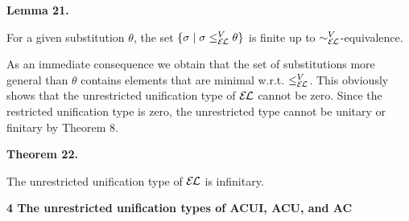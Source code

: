  
 
\par\medskip\noindent\textbf{Lemma 21.}\par
 
 
For a given substitution $\theta$, the set $\{\sigma\mid\sigma\leq_{\mathcal{E\mkern-1.618muL}}^{V}\theta\}$ is finite up to $\sim_{\mathcal{E\mkern-1.618muL}}^{V}$-equivalence.\par
 
 
 
 
As an immediate consequence we obtain that the set of substitutions more general than $\theta$ contains elements that are minimal w.r.t. $\leq_{\mathcal{E\mkern-1.618muL}}^{V}$. This obviously shows that the unrestricted unification type of $\mathcal{E\mkern-1.618muL}$ cannot be zero. Since the restricted unification type is zero, the unrestricted type cannot be unitary or finitary by Theorem 8.\par
 
 
 
\par\medskip\noindent\textbf{Theorem 22.}\par
 
 
The unrestricted unification type of $\mathcal{E\mkern-1.618muL}$ is infinitary.\par
 
 
 
 


 
\par\medskip\noindent\textbf{4 The unrestricted unification types of ACUI, ACU, and AC}\par
 
 
